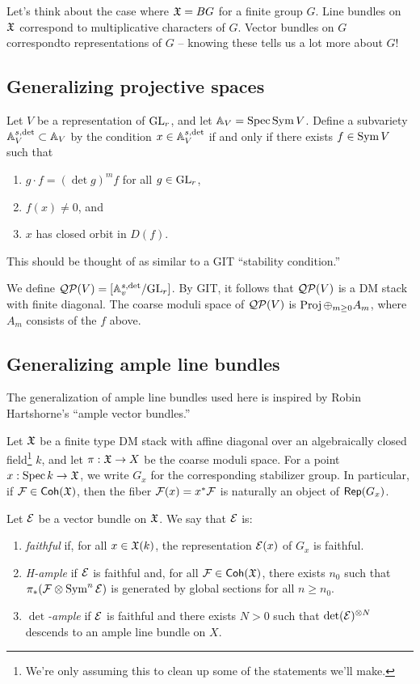 \documentclass{amsart}
\begin{document}
\begin{ex}
	Let's think about the case where $\Xfr = BG$ for a finite group $G$.
	Line bundles on $\Xfr$ correspond to multiplicative characters of $G$.
	Vector bundles on $G$ correspondto representations of $G$ -- knowing these tells us a lot more about $G$!
\end{ex}

\subsection{Generalizing projective spaces}

Let $V$ be a representation of $\GL_r$, and let $\AA_V = \Spec \Sym V$.
Define a subvariety $\AA_V^{s,\det} \subset \AA_V$ by the condition $x \in \AA^{s,\det}_V$ if and only if there exists $f \in \Sym V$ such that 
\begin{enumerate}
	\item $g \cdot f = (\det g)^m f$ for all $g \in \GL_r$,
	\item $f(x) \neq 0$, and
	\item $x$ has closed orbit in $D(f)$.
\end{enumerate}
This should be thought of as similar to a GIT ``stability condition.''

We define $\Qc\Pc(V) = [\AA_v^{s,\det} / \GL_r]$.
By GIT, it follows that $\Qc\Pc(V)$ is a DM stack with finite diagonal.
The coarse moduli space of $\Qc\Pc(V)$ is $\Proj \oplus_{m \geq 0} A_m$, where $A_m$ consists of the $f$ above.

\subsection{Generalizing ample line bundles}

The generalization of ample line bundles used here is inspired by Robin Hartshorne's ``ample vector bundles.''

Let $\Xfr$ be a finite type DM stack with affine diagonal over an algebraically closed field\footnote{We're only assuming this to clean up some of the statements we'll make.} $k$, and let $\pi: \Xfr \to X$ be the coarse moduli space.
For a point $x: \Spec k \to \Xfr$, we write $G_x$ for the corresponding stabilizer group.
In particular, if $\Fc \in \Coh(\Xfr)$, then the fiber $\Fc(x) = x^* \Fc$ is naturally an object of $\Rep(G_x)$.

\begin{dfn}
	Let $\Ec$ be a vector bundle on $\Xfr$.
	We say that $\Ec$ is:
	\begin{enumerate}
		\item \emph{faithful} if, for all $x \in \Xfr(k)$, the representation $\Ec(x)$ of $G_x$ is faithful.
		\item \emph{H-ample} if $\Ec$ is faithful and, for all $\Fc \in \Coh(\Xfr)$, there exists $n_0$ such that $\pi_*(\Fc \otimes \Sym^n \Ec)$ is generated by global sections for all $n \geq n_0$.
		\item \emph{$\det$-ample} if $\Ec$ is faithful and there exists $N > 0$ such that $\det(\Ec)^{\otimes N}$ descends to an ample line bundle on $X$.
	\end{enumerate}
\end{dfn}
\end{document}
